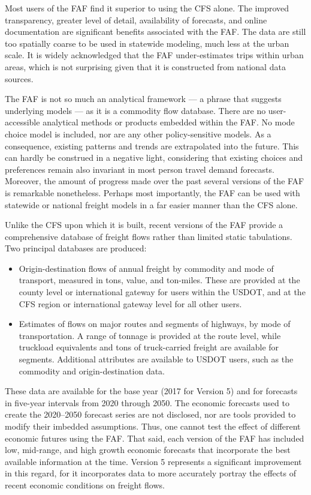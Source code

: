 Most users of the FAF find it superior to using the CFS alone. The improved transparency, greater level of detail, availability of forecasts, and online documentation are significant benefits associated with the FAF. The data are still too spatially coarse to be used in statewide modeling, much less at the urban scale. It is widely acknowledged that the FAF under-estimates trips within urban areas, which is not surprising given that it is constructed from national data sources.

The FAF is not so much an analytical framework --- a phrase that suggests underlying models --- as it is a commodity flow database. There are no user-accessible analytical methods or products embedded within the FAF. No mode choice model is included, nor are any other policy-sensitive models. As a consequence, existing patterns and trends are extrapolated into the future. This can hardly be construed in a negative light, considering that existing choices and preferences remain also invariant in most person travel demand forecasts. Moreover, the amount of progress made over the past several versions of the FAF is remarkable nonetheless. Perhaps most importantly, the FAF can be used with statewide or national freight models in a far easier manner than the CFS alone.

Unlike the CFS upon which it is built, recent versions of the FAF provide a comprehensive database of freight flows rather than limited static tabulations. Two principal databases are produced:
\begin{itemize}
\item Origin-destination flows of annual freight by commodity and mode of transport, measured in tons, value, and ton-miles. These are provided at the county level or international gateway for users within the USDOT, and at the CFS region or international gateway level for all other users.
\item Estimates of flows on major routes and segments of highways, by mode of transportation. A range of tonnage is provided at the route level, while truckload equivalents and tons of truck-carried freight are available for segments. Additional attributes are available to USDOT users, such as the commodity and origin-destination data.
\end{itemize}

\noindent These data are available for the base year (2017 for Version 5) and for forecasts in five-year intervals from 2020 through 2050. The economic forecasts used to create the 2020--2050 forecast series are not disclosed, nor are tools provided to modify their imbedded assumptions. Thus, one cannot test the effect of different economic futures using the FAF. That said, each version of the FAF has included low, mid-range, and high growth economic forecasts that incorporate the best available information at the time. Version 5 represents a significant improvement in this regard, for it incorporates data to more accurately portray the effects of recent economic conditions on freight flows.

